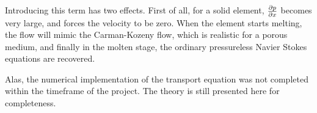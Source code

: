 Introducing this term has two effects. First of all, for a solid element,
$\frac{\partial p}{\partial x}$ becomes very large, and forces the velocity to be zero. When the
element starts melting, the flow will mimic the Carman-Kozeny flow, which is
realistic for a porous medium, and finally in the molten stage, the ordinary
pressureless Navier Stokes equations are recovered.

Alas, the numerical implementation of the transport equation was not completed
within the timeframe of the project. The theory is still presented here for
completeness.


